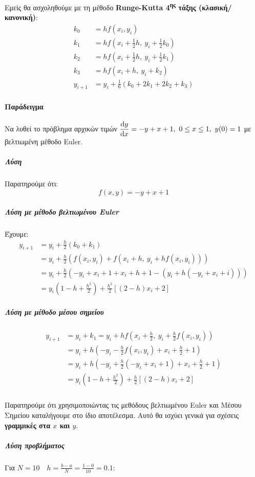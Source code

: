 \documentclass[11pt,a4paper,notitlepage,fleqn,final]{article}
\begin{document}
Εμείς θα ασχοληθούμε με τη μέθοδο \textbf{Runge-Kutta 4\textsuperscript{ης}
τάξης (κλασική/κανονική)}:
\[
\boxed{\begin{array}{rl}
	k_0 &= hf(x_i,y_i) \\
	k_1 &= hf(x_i+\frac{1}{2}h,\ y_i + \frac{1}{2}k_0) \\
	k_2 &= hf(x_i+\frac{1}{2}h,\ y_i+\frac{1}{2}k_1) \\
	k_3 &= hf(x_i+h,\ y_i+k_2) \\
	y_{i+1} &= \boxed{y_i+\frac{1}{6}\left(k_0+2k_1+2k_2+k_3\right)}
	\end{array}}
\]

\paragraph{Παράδειγμα}
Να λυθεί το πρόβλημα αρχικών τιμών \( \displaystyle
\od{y}{x} = -y+x+1,\ 0\leq x \leq 1,\ y(0)=1
 \) με βελτιωμένη μέθοδο Euler.
\subparagraph{Λύση}
Παρατηρούμε ότι:
\[
f(x,y) = -y+x+1
\]

\subparagraph{Λύση με μέθοδο βελτιωμένου Euler}
Έχουμε:
\begin{align*}
	y_{i+1} &= y_i +\frac{h}{2}(k_0+k_1)
	\\ &= y_i+\frac{h}{2}\left(
	f(x_i,y_i) + f\left( x_i+h,\ y_i+hf(x_i,y_i) \right)
	\right)
	\\ &= y_i + \frac{h}{2}\left(-y_i+x_i+1
	+x_i+h+1-\left(
	y_i+h(-y_i+x_i+i)
	\right)\right)
	\\ &=
	y_i\left(1-h+\frac{h^2}{2}\right) + \frac{h^2}{2}\left[
	(2-h)x_i+2
	\right] \end{align*}

\subparagraph{Λύση με μέθοδο μέσου σημείου}
	\begin{align*}
	y_{i+1} &= y_i+k_1 = y_i+hf\left(x_i+\frac{h}{2},
	\ y_i+\frac{h}{2}f(x_i,y_i)\right)
	\\ &= y_i+h\left(-y_i-\frac{h}{2}f(x_i,y_i)+x_i+\frac{h}{2}+1\right)
	\\ &= y_i +
	h\left(-y_i+\frac{h}{2}(-y_i+x_i+1)+x_i+\frac{h}{2}+1\right)
	\\ &= y_i\left(1-h+\frac{h^2}{2}\right)+\frac{h}{2}\left[
	(2-h)x_i+2
	\right]
\end{align*}

\subparagraph{}
Παρατηρούμε ότι χρησιμοποιώντας τις μεθόδους βελτιωμένου Euler και Μέσου
Σημείου καταλήγουμε στο ίδιο αποτέλεσμα. Αυτό θα ισχύει γενικά για
σχέσεις \textbf{γραμμικές στα \( x \) και \( y \)}.

\subparagraph{Λύση προβλήματος}
Για \( N=10\quad h= \frac{b-a}{N}=\frac{1-0}{10}=0.1 \):
\end{document}
